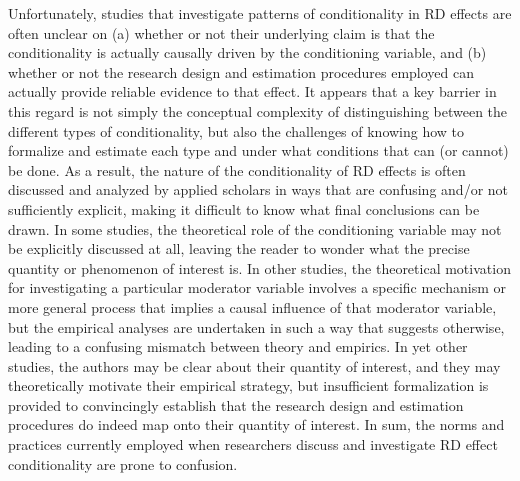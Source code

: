 \documentclass[12pt]{article}
\begin{document}
Unfortunately, studies that investigate patterns of conditionality in RD effects are often unclear on (a) whether or not their underlying claim is that the conditionality is actually causally driven by the conditioning variable, and (b) whether or not the research design and estimation procedures employed can actually provide reliable evidence to that effect. It appears that a key barrier in this regard is not simply the conceptual complexity of distinguishing between the different types of conditionality, but also the challenges of knowing how to formalize and estimate each type and under what conditions that can (or cannot) be done. As a result, the nature of the conditionality of RD effects is often discussed and analyzed by applied scholars in ways that are confusing and/or not sufficiently explicit, making it difficult to know what final conclusions can be drawn. In some studies, the theoretical role of the conditioning variable may not be explicitly discussed at all, leaving the reader to wonder what the precise quantity or phenomenon of interest is. In other studies, the theoretical motivation for investigating a particular moderator variable involves a specific mechanism or more general process that implies a causal influence of that moderator variable, but the empirical analyses are undertaken in such a way that suggests otherwise, leading to a confusing mismatch between theory and empirics. In yet other studies, the authors may be clear about their quantity of interest, and they may theoretically motivate their empirical strategy, but insufficient formalization is provided to convincingly establish that the research design and estimation procedures do indeed map onto their quantity of interest. In sum, the norms and practices currently employed when researchers discuss and investigate RD effect conditionality are prone to confusion.
\end{document}
